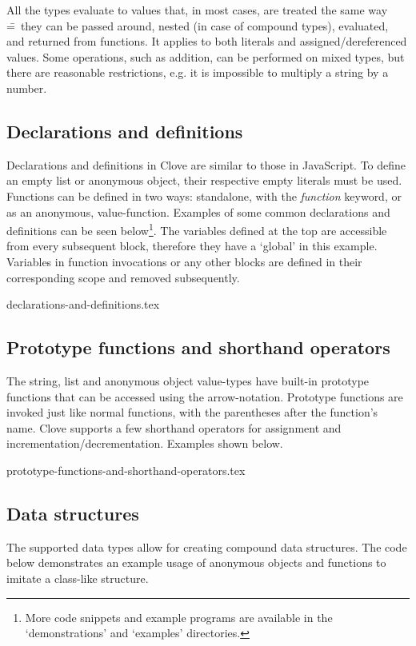 \documentclass[12pt,a4paper]{article}
\begin{document}
All the types evaluate to values that, in most cases, are treated the same way \==~they can be passed around, nested (in case of compound types), evaluated, and returned from functions. It applies to both literals and assigned/dereferenced values. Some operations, such as addition, can be performed on mixed types, but there are reasonable restrictions, e.g. it is impossible to multiply a string by a number.



\subsection*{Declarations and definitions}
Declarations and definitions in Clove are similar to those in JavaScript. To define an empty list or anonymous object, their respective empty literals must be used. Functions can be defined in two ways: standalone, with the \emph{function} keyword, or as an anonymous, value-function. Examples of some common declarations and definitions can be seen below\footnote{More code snippets and example programs are available in the `demonstrations' and `examples' directories.}. The variables defined at the top are accessible from every subsequent block, therefore they have a `global' in this example. Variables in function invocations or any other blocks are defined in their corresponding scope and removed subsequently.

{declarations-and-definitions.tex}



\subsection*{Prototype functions and shorthand operators}
The string, list and anonymous object value-types have built-in prototype functions that can be accessed using the arrow-notation. Prototype functions are invoked just like normal functions, with the parentheses after the function's name. Clove supports a few shorthand operators for assignment and incrementation/decrementation. Examples shown below.

{prototype-functions-and-shorthand-operators.tex}



\subsection*{Data structures}
The supported data types allow for creating compound data structures. The code below demonstrates an example usage of anonymous objects and functions to imitate a class-like structure.
\end{document}

